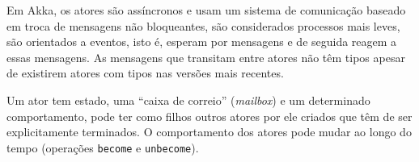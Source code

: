 Em Akka, os atores são assíncronos e usam um sistema de comunicação baseado em troca de mensagens não bloqueantes, são considerados processos mais leves, são orientados a eventos, isto é, esperam por mensagens e de seguida reagem a essas mensagens. As mensagens que transitam entre atores não têm tipos apesar de existirem atores com tipos nas versões mais recentes.

Um ator tem estado, uma ``caixa de correio'' (\textit{mailbox}) e um determinado comportamento, pode ter como filhos outros atores por ele criados que têm de ser explicitamente terminados. O comportamento dos atores pode mudar ao longo do tempo (operações \lstinline"become" e \lstinline"unbecome").


